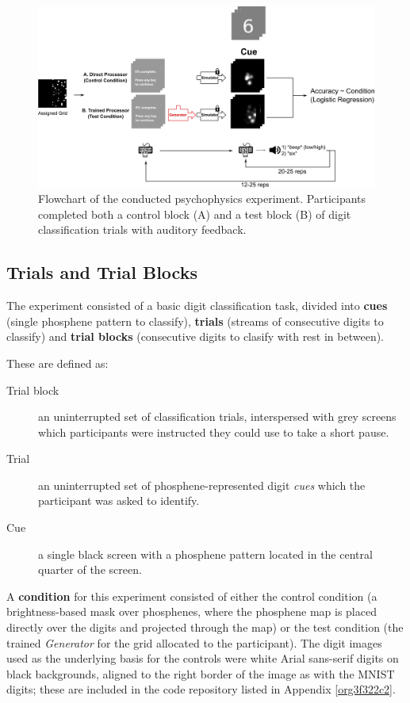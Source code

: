 \documentclass[a4paper,11pt,openany]{book}
\begin{document}
\begin{figure}
\begin{center}
\includegraphics[width=.9\linewidth]{./images/method_psychophysics.png}
\end{center}
\caption[Flowchart of psychophysics experiment.]{\label{org3d8c578}
Flowchart of the conducted psychophysics experiment. Participants completed both a control block (A) and a test block (B) of digit classification trials with auditory feedback.}
\end{figure}


\subsection*{Trials and Trial Blocks}
\label{sec:org31d78b2}

The experiment consisted of a basic digit classification task, divided into \textbf{cues} (single phosphene pattern to classify), \textbf{trials} (streams of consecutive digits to classify) and \textbf{trial blocks} (consecutive digits to clasify with rest in between).

These are defined as:
\begin{description}
\item[{Trial block}] an uninterrupted set of classification trials, interspersed with grey screens which participants were instructed they could use to take a short pause.
\item[{Trial}] an uninterrupted set of phosphene-represented digit \emph{cues} which the participant was asked to identify.
\item[{Cue}] a single black screen with a phosphene pattern located in the central quarter of the screen.
\end{description}

A \textbf{condition} for this experiment consisted of either the control condition (a brightness-based mask over phosphenes, where the phosphene map is placed directly over the digits and projected through the map) or the test condition (the trained \emph{Generator} for the grid allocated to the participant).
The digit images used as the underlying basis for the controls were white Arial sans-serif digits on black backgrounds, aligned to the right border of the image as with the MNIST digits; these are included in the code repository listed in Appendix \ref{org3f322c2}.
\end{document}

